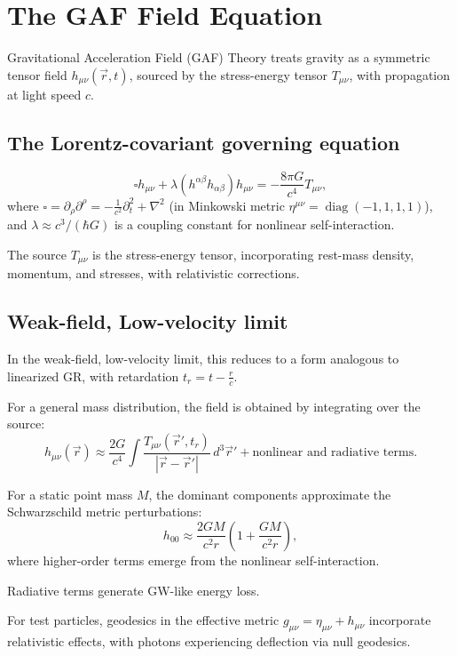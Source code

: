 \documentclass{article}
\begin{document}
\section{The GAF Field Equation}

Gravitational Acceleration Field (GAF) Theory treats gravity as a symmetric tensor field $ h_{\mu\nu}(\vec{r}, t) $, sourced by the stress-energy tensor $ T_{\mu\nu} $, with propagation at light speed $ c $. 

\subsection{The Lorentz-covariant governing equation}
$$\square h_{\mu\nu} + \lambda (h^{\alpha\beta} h_{\alpha\beta}) h_{\mu\nu} = -\frac{8\pi G}{c^4} T_{\mu\nu},$$
where $ \square = \partial_\rho \partial^\rho = -\frac{1}{c^2} \partial_t^2 + \nabla^2 $ (in Minkowski metric $ \eta^{\mu\nu} = \operatorname{diag}(-1,1,1,1) $), and $\lambda \approx c^3 / (\hbar G)$ is a coupling constant for nonlinear self-interaction.  

The source $ T_{\mu\nu} $ is the stress-energy tensor, incorporating rest-mass density, momentum, and stresses, with relativistic corrections.

\subsection{Weak-field, Low-velocity limit}
In the weak-field, low-velocity limit, this reduces to a form analogous to linearized GR, with retardation $ t_r = t - \frac{r}{c} $.

For a general mass distribution, the field is obtained by integrating over the source:
$$h_{\mu\nu}(\vec{r}) \approx \frac{2G}{c^4} \int \frac{T_{\mu\nu}(\vec{r}', t_r)}{|\vec{r} - \vec{r}'|} \, d^3 \vec{r}' + \text{nonlinear and radiative terms}.$$

For a static point mass $ M $, the dominant components approximate the Schwarzschild metric perturbations:
$$h_{00} \approx \frac{2 G M}{c^2 r} \left( 1 + \frac{G M}{c^2 r} \right),$$
where higher-order terms emerge from the nonlinear self-interaction.

Radiative terms generate GW-like energy loss. 

For test particles, geodesics in the effective metric $ g_{\mu\nu} = \eta_{\mu\nu} + h_{\mu\nu} $ incorporate relativistic effects, with photons experiencing deflection via null geodesics.
\end{document}
